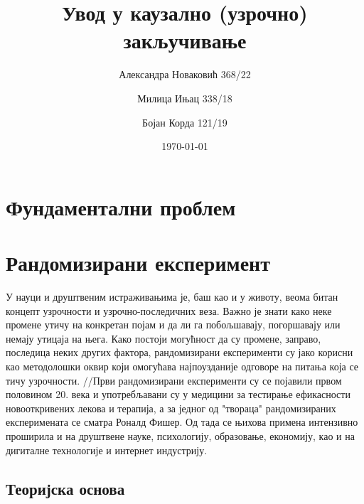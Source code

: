 \documentclass[12pt, a4paper]{article}
\title{Увод у каузално (узрочно) закључивање}
\author{Александра Новаковић 368/22}
\author{Милица Ињац 338/18}
\author{Бојан Корда 121/19}
\affil{Математички факултет, Универзитет у Београду}
\date{\today}
\begin{document}
\maketitle
\newpage

\tableofcontents
\newpage

\section{Фундаментални проблем}
\newpage



\section{Рандомизирани експеримент}

У науци и друштвеним истраживањима је, баш као и у животу, веома битан концепт узрочности и 
узрочно-последичних веза. Важно је знати како неке промене утичу на конкретан појам и да ли га 
побољшавају, погоршавају или немају утицаја на њега. Како постоји могућност да су промене, 
заправо, последица неких других фактора, рандомизирани експерименти су јако корисни као 
методолошки оквир који омогућава најпоузданије одговоре на питања која се тичу узрочности.
//Први рандомизирани експерименти су се појавили првом половином 20. века и употребљавани су у 
медицини за тестирање ефикасности новооткривених лекова и терапија, а за једног од "твораца" 
рандомизираних експеримената се сматра Роналд Фишер. Од тада се њихова примена интензивно 
проширила и на друштвене науке, психологију, образовање, економију, као и на дигиталне технологије 
и интернет индустрију.

\subsection{Теоријска основа}
\end{document}
